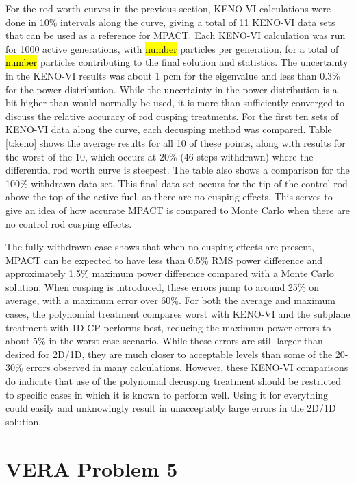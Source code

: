 For the rod worth curves in the previous section, KENO-VI calculations were done in 10\% intervals along the curve, giving a total of 11 KENO-VI data sets that can be used as a reference for MPACT.  Each KENO-VI calculation was run for 1000 active generations, with \hl{number} particles per generation, for a total of \hl{number} particles contributing to the final solution and statistics.  The uncertainty in the KENO-VI results was about 1 pcm for the eigenvalue and less than 0.3\% for the power distribution.  While the uncertainty in the power distribution is a bit higher than would normally be used, it is more than sufficiently converged to discuss the relative accuracy of rod cusping treatments.  For the first ten sets of KENO-VI data along the curve, each decusping method was compared.  Table \ref{t:keno} shows the average results for all 10 of these points, along with results for the worst of the 10, which occurs at 20\% (46 steps withdrawn) where the differential rod worth curve is steepest.  The table also shows a comparison for the 100\% withdrawn data set.  This final data set occurs for the tip of the control rod above the top of the active fuel, so there are no cusping effects.  This serves to give an idea of how accurate MPACT is compared to Monte Carlo when there are no control rod cusping effects.

The fully withdrawn case shows that when no cusping effects are present, MPACT can be expected to have less than 0.5\% RMS power difference and approximately 1.5\% maximum power difference compared with a Monte Carlo solution.  When cusping is introduced, these errors jump to around 25\% on average, with a maximum error over 60\%.  For both the average and maximum cases, the polynomial treatment compares worst with KENO-VI and the subplane treatment with 1D CP performs best, reducing the maximum power errors to about 5\% in the worst case scenario.  While these errors are still larger than desired for 2D/1D, they are much closer to acceptable levels than some of the 20-30\% errors observed in many calculations.  However, these KENO-VI comparisons do indicate that use of the polynomial decusping treatment should be restricted to specific cases in which it is known to perform well.  Using it for everything could easily and unknowingly result in unacceptably large errors in the 2D/1D solution.

\section{VERA Problem 5}

